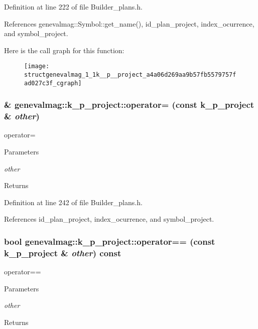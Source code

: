 Definition at line 222 of file Builder\_\-plans.h.



References genevalmag::Symbol::get\_\-name(), id\_\-plan\_\-project, index\_\-ocurrence, and symbol\_\-project.



Here is the call graph for this function:\nopagebreak
\begin{figure}[H]
\begin{center}
\leavevmode
\texttt{[image: structgenevalmag\_1\_1k\_\_p\_\_project\_a4a06d269aa9b57fb5579757fad027c3f\_cgraph]}
\end{center}
\end{figure}


\hypertarget{structgenevalmag_1_1k__p__project_ae64d4643b5a6e52389a540b5725dc148}{
\subsubsection[{operator=}]{\& genevalmag::k\_\-p\_\-project::operator= (const {\bf k\_\-p\_\-project} \& {\em other})}}
\label{structgenevalmag_1_1k__p__project_ae64d4643b5a6e52389a540b5725dc148}
operator= 
\begin{DoxyParams}{Parameters}
\item[{\em other}]\end{DoxyParams}
\begin{DoxyReturn}{Returns}

\end{DoxyReturn}


Definition at line 242 of file Builder\_\-plans.h.



References id\_\-plan\_\-project, index\_\-ocurrence, and symbol\_\-project.

\hypertarget{structgenevalmag_1_1k__p__project_a277ca3092cf5e354a88ee0d63ac4bc25}{
\subsubsection[{operator==}]{\setlength{\rightskip}{0pt plus 5cm}bool genevalmag::k\_\-p\_\-project::operator== (const {\bf k\_\-p\_\-project} \& {\em other}) const}}
\label{structgenevalmag_1_1k__p__project_a277ca3092cf5e354a88ee0d63ac4bc25}
operator== 
\begin{DoxyParams}{Parameters}
\item[{\em other}]\end{DoxyParams}
\begin{DoxyReturn}{Returns}

\end{DoxyReturn}



